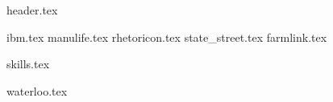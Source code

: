 \documentclass[11pt]{article}
\begin{document}
{header.tex}

{ibm.tex}
{manulife.tex}
{rhetoricon.tex}
{state_street.tex}
{farmlink.tex}

{skills.tex}

{waterloo.tex}


\end{document}
